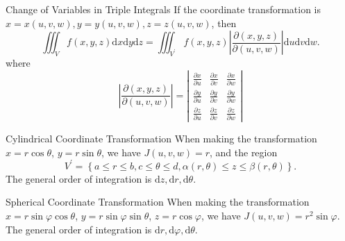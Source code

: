 \begin{proposition}{Change of Variables in Triple Integrals}{}
  If the coordinate transformation is $x = x(u,v,w), y=y(u,v,w), z=z(u,v,w)$,
  then
  \begin{equation}
     \iiint _V f(x,y,z) \mathrm{d}x\mathrm{d}y\mathrm{d}z = \iiint_{V^{\prime}}f(x,y,z)\left|\frac{\partial (x,y,z)}{\partial(u,v,w)}\right|\mathrm{d}u\mathrm{d}v\mathrm{d}w.
  \end{equation}
  where
  \begin{equation}
    \left|\frac{\partial(x,y,z)}{\partial(u,v,w)}\right| = \left|
      \begin{array}{ccc}
        \frac{\partial x}{\partial u}&\frac{\partial x}{\partial v}&\frac{\partial x}{\partial w}\\
        \frac{\partial y}{\partial u}&\frac{\partial y}{\partial v}&\frac{\partial y}{\partial w} \\
                                     \frac{\partial z}{\partial u}&\frac{\partial z}{\partial v}&\frac{\partial z}{\partial w}
      \end{array}
    \right|
  \end{equation}
\end{proposition}

\begin{proposition}{Cylindrical Coordinate Transformation}{}
  When making the transformation $x = r\cos \theta$, $y = r\sin \theta$,
  we have $J(u,v,w) = r$, and the region
  \begin{equation}
    V^{\prime} = \left\{ a \leq r \leq b, c \leq \theta \leq d, \alpha(r,\theta) \leq z \leq \beta(r,\theta) \right\}.
  \end{equation}
  The general order of integration is $\mathrm{d}z, \mathrm{d} r, \mathrm{d} \theta$.
\end{proposition}


\begin{proposition}{Spherical Coordinate Transformation}{}
  When making the transformation $x = r\sin \varphi\cos \theta$,
  $y = r\sin \varphi\sin \theta$,
  $z = r \cos \varphi$,
  we have $J(u,v,w) = r^2 \sin \varphi$.
  The general order of integration is $\mathrm{d}r, \mathrm{d} \varphi, \mathrm{d} \theta$.
\end{proposition}







